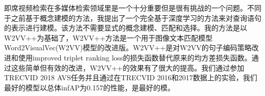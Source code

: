 \begin{abstractzh}
    即席视频检索在多媒体检索领域里是一个十分重要但是很有挑战的一个问题。不同于之前基于概念建模的方法，我提出了一个完全基于深度学习的方法来对查询语句的表示进行建模。该方法不需要显式的概念建模、匹配和选择。我的方法是以W2VV++为基础了，W2VV++方法是一个用于图像文本匹配模型Word2VisualVec(W2VV)模型的改进版。W2VV++是对W2VV的句子编码策略改进和使用improved triplet ranking loss的损失函数替代原来的均方差损失函数。通过这些简单但有效的改进，W2VV++的效果有了很大的提高。我们通过参加TRECVID 2018 AVS任务并且通过在TRECVID 2016和2017数据上的实验，我们最好的模型以总体infAP为0.157的性能，是最好的模。
\end{abstractzh}
